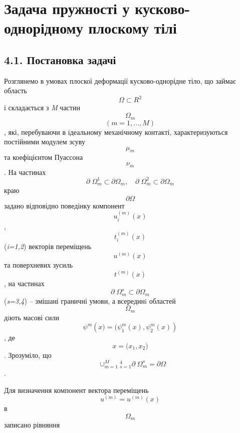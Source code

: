 \hypertarget{ux437ux430ux434ux430ux447ux430-ux43fux440ux443ux436ux43dux43eux441ux442ux456-ux443-ux43aux443ux441ux43aux43eux432ux43e-ux43eux434ux43dux43eux440ux456ux434ux43dux43eux43cux443-ux43fux43bux43eux441ux43aux43eux43cux443-ux442ux456ux43bux456}{%
\section[Задача пружності у кусково-однорідному плоскому
тілі]{\texorpdfstring{\protect\hypertarget{anchor-53}{}{}Задача
пружності у кусково-однорідному плоскому
тілі}{Задача пружності у кусково-однорідному плоскому тілі}}\label{ux437ux430ux434ux430ux447ux430-ux43fux440ux443ux436ux43dux43eux441ux442ux456-ux443-ux43aux443ux441ux43aux43eux432ux43e-ux43eux434ux43dux43eux440ux456ux434ux43dux43eux43cux443-ux43fux43bux43eux441ux43aux43eux43cux443-ux442ux456ux43bux456}}

\hypertarget{ux43fux43eux441ux442ux430ux43dux43eux432ux43aux430-ux437ux430ux434ux430ux447ux456-2}{%
\subsection[4.1. Постановка
задачі]{\texorpdfstring{\protect\hypertarget{anchor-54}{}{}4.1.
Постановка
задачі}{4.1. Постановка задачі}}\label{ux43fux43eux441ux442ux430ux43dux43eux432ux43aux430-ux437ux430ux434ux430ux447ux456-2}}

Розглянемо в умовах плоскої деформації кусково-однорідне тіло, що займає
область \[{\Omega\subset R^{2}}{}\] і склада­ється з \emph{M }частин
\[\Omega_{m}{}\] \[{({m = 1},\text{.}\text{.}\text{.},M)}{}\], які,
перебуваючи в ідеальному механічному контакті, характери­зу­ються
постійними модулем зсуву \[\mu_{m}{}\] та коефіцієн­том Пуассона
\[\nu_{m}{}\]. На частинах
\[{\partial \Omega_{m}^{1}\subset\partial\Omega_{m},\quad\partial \Omega_{m}^{2}\subset\partial\Omega_{m}}{}\]
краю \[{\partial\Omega}{}\] задано від­по­відно пове­дінку компонент
\[{u_{i}^{(m)}(x)}{}\], \[{t_{i}^{(m)}(x)}{}\] (\emph{i=1,2}) векторів
переміщень \[{u^{(m)}(x)}{}\] та поверхневих зусиль \[{t^{(m)}(x)}{}\],
на частинах \[{\partial \Omega_{m}^{s}\subset\partial\Omega_{m}}{}\]
(\emph{s=3,4}) -- змішані граничні умови, а всере­динi областей
\[\Omega_{m}{}\] дiють масові сили
\[{\psi^{m}(x{) = (}\psi_{1}^{m}(x),\psi_{2}^{m}(x))}{}\], де
\[{{x = (}x_{1},x_{2})}{}\]. Зрозуміло, що
\[{{\mspace{9mu} \cup_{m = 1}^{M}{}_{s = 1}^{4}}\partial {\Omega_{m}^{s} = \partial}\Omega}{}\].

Для визначення компонент вектора перемі­щень
\[{{u^{(m)} = u^{(m)}}(x)}{}\] в \[\Omega_{m}{}\] записано рівняння

